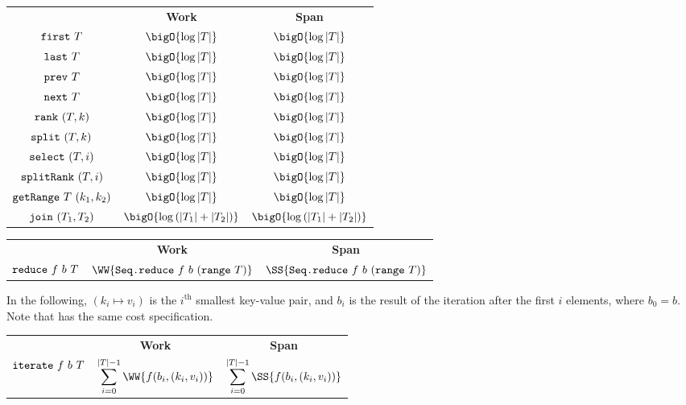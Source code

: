 \begin{costspec}
\begin{tabular}{c|c|c}
& \textbf{Work} & \textbf{Span} \\
$\texttt{first}~T$ & $\bigO{\log|T|}$ & $\bigO{\log|T|}$ \\
$\texttt{last}~T$ & $\bigO{\log|T|}$ & $\bigO{\log|T|}$ \\
$\texttt{prev}~T$ & $\bigO{\log|T|}$ & $\bigO{\log|T|}$ \\
$\texttt{next}~T$ & $\bigO{\log|T|}$ & $\bigO{\log|T|}$ \\
$\texttt{rank}~(T, k)$ & $\bigO{\log|T|}$ & $\bigO{\log|T|}$ \\
$\texttt{split}~(T, k)$ & $\bigO{\log|T|}$ & $\bigO{\log|T|}$ \\
$\texttt{select}~(T, i)$ & $\bigO{\log|T|}$ & $\bigO{\log|T|}$ \\
$\texttt{splitRank}~(T, i)$ & $\bigO{\log|T|}$ & $\bigO{\log|T|}$ \\
$\texttt{getRange}~T~(k_1, k_2)$ & $\bigO{\log|T|}$ & $\bigO{\log|T|}$
\\
$\texttt{join}~(T_1, T_2)$ &
$\bigO{\log\left(|T_1| + |T_2|\right)}$ &
$\bigO{\log\left(|T_1| + |T_2|\right)}$
\end{tabular}
\end{costspec}

\begin{costspec}[Reduce]
\begin{tabular}{c|c|c}
& \textbf{Work} & \textbf{Span} \\
$\texttt{reduce}~f~b~T$ &
$\WW{\sml{Seq.reduce}~f~b~(\sml{range}~T)}$ &
$\SS{\sml{Seq.reduce}~f~b~(\sml{range}~T)}$
\end{tabular}
\end{costspec}

\begin{costspec}[Iteration]
In the following, $(k_i \mapsto v_i)$ is the $i^\text{th}$ smallest key-value
pair, and $b_i$ is the result of the iteration after the first $i$ elements,
where $b_0 = b$. Note that  has the same cost specification.
\begin{tabular}{c|c|c}
& \textbf{Work} & \textbf{Span} \\
$\texttt{iterate}~f~b~T$ &
$\displaystyle\sum_{i=0}^{|T|-1} \WW{f(b_i, (k_i, v_i))}$ &
$\displaystyle\sum_{i=0}^{|T|-1} \SS{f(b_i, (k_i, v_i))}$
\end{tabular}
\end{costspec}

